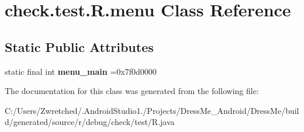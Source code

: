 \hypertarget{classcheck_1_1test_1_1_r_1_1menu}{}\section{check.\+test.\+R.\+menu Class Reference}
\label{classcheck_1_1test_1_1_r_1_1menu}
\subsection*{Static Public Attributes}
\begin{DoxyCompactItemize}
\item 
\hypertarget{classcheck_1_1test_1_1_r_1_1menu_ade2d72708302b3b85aa2f9f1b952262f}{}static final int {\bfseries menu\+\_\+main} =0x7f0d0000\label{classcheck_1_1test_1_1_r_1_1menu_ade2d72708302b3b85aa2f9f1b952262f}

\end{DoxyCompactItemize}


The documentation for this class was generated from the following file\+:\begin{DoxyCompactItemize}
\item 
C\+:/\+Users/\+Zwretched/.\+Android\+Studio1./\+Projects/\+Dress\+Me\+\_\+\+Android/\+Dress\+Me/build/generated/source/r/debug/check/test/R.\+java\end{DoxyCompactItemize}
